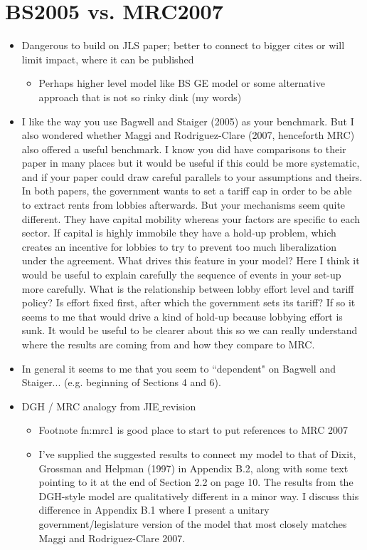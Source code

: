 \documentclass[12pt]{article}
\begin{document}
\section{BS2005 vs. MRC2007}
	\begin{itemize}
		\item Dangerous to build on JLS paper; better to connect to bigger cites or will limit impact, where it can be published
			\begin{itemize}
				\item Perhaps higher level model like BS GE model or some alternative approach that is not so rinky dink (my words)
			\end{itemize}
		\item I like the way you use Bagwell and Staiger (2005) as your benchmark.  But I also wondered whether Maggi and Rodriguez-Clare (2007, henceforth MRC) also offered a useful benchmark.  I know you did have comparisons to their paper in many places but it would be useful if this could be more systematic, and if your paper could draw careful parallels to your assumptions and theirs.  In both papers, the government wants to set a tariff cap in order to be able to extract rents from lobbies afterwards.  But your mechanisms seem quite different.  They have capital mobility whereas your factors are specific to each sector.  If capital is highly immobile they have a hold-up problem, which creates an incentive for lobbies to try to prevent too much liberalization under the agreement.  What drives this feature in your model?  Here I think it would be useful to explain carefully the sequence of events in your set-up more carefully.  What is the relationship between lobby effort level and tariff policy?  Is effort fixed first, after which the government sets its tariff?  If so it seems to me that would drive a kind of hold-up because lobbying effort is sunk.  It would be useful to be clearer about this so we can really understand where the results are coming from and how they compare to MRC. 
		\item In general it seems to me that you seem to ``dependent" on Bagwell and Staiger... (e.g. beginning of Sections 4 and 6).
		\item DGH / MRC analogy from JIE$\_$revision
			\begin{itemize}
				\item Footnote fn:mrc1 is good place to start to put references to MRC 2007
				\item I've supplied the suggested results to connect my model to that of Dixit, Grossman and Helpman (1997) in Appendix B.2, along with some text pointing to it at the end of Section 2.2 on page 10. The results from the DGH-style model are qualitatively different in a minor way. I discuss this difference in Appendix B.1 where I present a unitary government/legislature version of the model that most closely matches Maggi and Rodriguez-Clare 2007.

\end{itemize}
\end{itemize}
\end{document}
